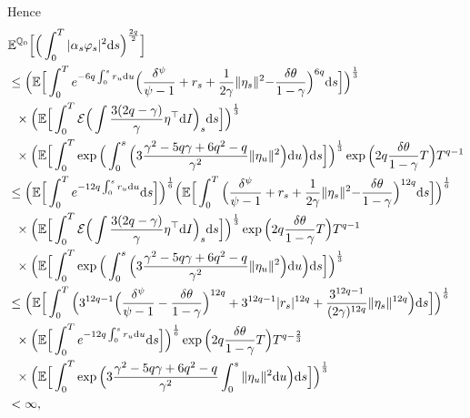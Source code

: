 \documentclass[12,reqno]{amsart}
\numberwithin{equation}{section}
\begin{document}
Hence
\begin{align*}
	&\mathbb{E}^{\mathbb{Q}_{0}}\Big[\Big(\int_{0}^{T}|\alpha_{s}\varphi_{s}|^{2}\mathrm{d}s\Big)^{\frac{2q}{2}}\Big]\notag\\
	&\le\Big(\mathbb{E}\Big[\int_{0}^{T}e^{-6q\int_{0}^{s}r_{u}\mathrm{d}u}\Big(\frac{\delta^{\psi}}{\psi-1}+r_{s}+\frac{1}{2\gamma}\|\eta_{s}\|^{2}{-\frac{\delta\theta}{1-\gamma}}\Big)^{6q}\mathrm{d}s\Big]\Big)^{\frac{1}{3}}\notag\\
	&\phantom{x}\times\Big(\mathbb{E}\Big[\int_{0}^{T}\mathcal{E}\Big(\int\frac{3(2q-\gamma)}{\gamma}\eta^{\top}\mathrm{d}I\Big)_{s}\mathrm{d}s\Big]\Big)^{\frac{1}{3}}\notag\\
	&\phantom{x}\times\Big(\mathbb{E}\Big[\int_{0}^{T}\exp\Big(\int_{0}^{s}\Big(3\frac{\gamma^{2}-5q\gamma+6q^{2}-q}{\gamma^{2}}\|\eta_{u}\|^{2}\Big)\mathrm{d}u\Big)\mathrm{d}s\Big]\Big)^{\frac{1}{3}}\exp\Big({2q\frac{\delta\theta}{1-\gamma}}T\Big)T^{q-1}\notag\\
	&\le\Big(\mathbb{E}\Big[\int_{0}^{T}e^{-12q\int_{0}^{s}r_{u}\mathrm{d}u}\mathrm{d}s\Big]\Big)^{\frac{1}{6}}\Big(\mathbb{E}\Big[\int_{0}^{T}\Big(\frac{\delta^{\psi}}{\psi-1}+r_{s}+\frac{1}{2\gamma}\|\eta_{s}\|^{2}{-\frac{\delta\theta}{1-\gamma}}\Big)^{12q}\mathrm{d}s\Big]\Big)^{\frac{1}{6}}\notag\\
	&\phantom{x}\times\Big(\mathbb{E}\Big[\int_{0}^{T}\mathcal{E}\Big(\int\frac{3(2q-\gamma)}{\gamma}\eta^{\top}\mathrm{d}I\Big)_{s}\mathrm{d}s\Big]\Big)^{\frac{1}{3}}\exp\Big({2q\frac{\delta\theta}{1-\gamma}}T\Big)T^{q-1}\notag\\
	&\phantom{x}\times\Big(\mathbb{E}\Big[\int_{0}^{T}\exp\Big(\int_{0}^{s}\Big(3\frac{\gamma^{2}-5q\gamma+6q^{2}-q} {\gamma^{2}}\|\eta_{u}\|^{2}\Big)\mathrm{d}u\Big)\mathrm{d}s\Big]\Big)^{\frac{1}{3}}\notag\\
	&\le\Big(\mathbb{E}\Big[\int_{0}^{T}\Big(3^{12q-1}\Big(\frac{\delta^{\psi}}{\psi-1}-\frac{\delta\theta}{1-\gamma}\Big)^{12q}+3^{12q-1}|r_{s}|^{12q}+\frac{3^{12q-1}}{(2\gamma)^{12q}}\|\eta_{s}\|^{12q}\Big)\mathrm{d}s\Big]\Big)^{\frac{1}{6}}\notag\\
	&\phantom{x}\times\Big(\mathbb{E}\Big[\int_{0}^{T}e^{-12q\int_{0}^{s}r_{u}\mathrm{d}u}\mathrm{d}s\Big]\Big)^{\frac{1}{6}}\exp\Big({2q\frac{\delta\theta}{1-\gamma}}T\Big)T^{q-\frac{2}{3}}\notag\\
	&\phantom{x}\times\Big(\mathbb{E}\Big[\int_{0}^{T}\exp\Big(3\frac{\gamma^{2}-5q\gamma+6q^{2}-q}{\gamma^{2}}\int_{0}^{s}\|\eta_{u}\|^{2}\mathrm{d}u\Big)\mathrm{d}s\Big]\Big)^{\frac{1}{3}}\notag\\
	&<\infty,
\end{align*}
\end{document}
